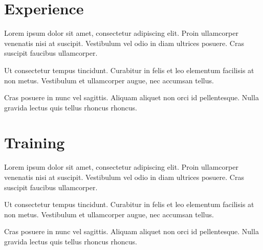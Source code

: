 \documentclass[]{plushcv}
\begin{document}
\begin{minipage}[t]{0.66\textwidth} 



\section{Experience}
\vspace{\topsep} %
\begin{tightemize}
\sectionsep
\item Lorem ipsum dolor sit amet, consectetur adipiscing elit. Proin ullamcorper venenatis nisi at suscipit. Vestibulum vel odio in diam ultrices posuere. Cras suscipit faucibus ullamcorper.
\item Ut consectetur tempus tincidunt. Curabitur in felis et leo elementum facilisis at non metus. Vestibulum et ullamcorper augue, nec accumsan tellus. 
\item Cras posuere in nunc vel sagittis. Aliquam aliquet non orci id pellentesque. Nulla gravida lectus quis tellus rhoncus rhoncus.  
\end{tightemize}
\sectionsep



\section{Training}
\vspace{\topsep} %
\begin{tightemize}
\sectionsep
\item Lorem ipsum dolor sit amet, consectetur adipiscing elit. Proin ullamcorper venenatis nisi at suscipit. Vestibulum vel odio in diam ultrices posuere. Cras suscipit faucibus ullamcorper.
\item Ut consectetur tempus tincidunt. Curabitur in felis et leo elementum facilisis at non metus. Vestibulum et ullamcorper augue, nec accumsan tellus. \item Cras posuere in nunc vel sagittis. Aliquam aliquet non orci id pellentesque. Nulla gravida lectus quis tellus rhoncus rhoncus.  
\end{tightemize}
\sectionsep




\end{minipage}
\end{document}
